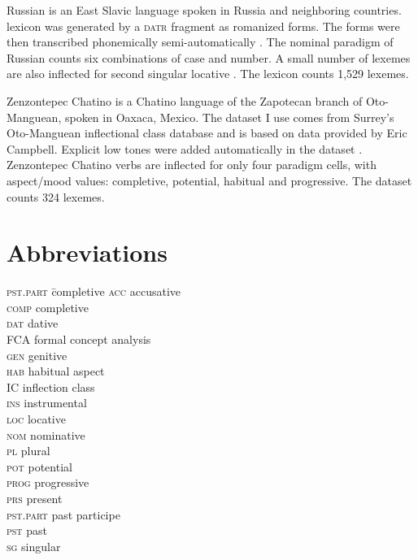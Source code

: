\documentclass[output=paper]{langscibook}
\begin{document}
    Russian is an East Slavic language spoken in Russia and neighboring countries.   lexicon was generated by a \textsc{datr} fragment \cite{BrownHippisley2012} as romanized forms. The forms were then transcribed phonemically semi-automatically \citep{BeniaminePhd}. The nominal paradigm of Russian counts six combinations of case and number. A small number of lexemes are also inflected for second singular locative \citep[see][]{Brown2007}. The lexicon counts 1,529 lexemes.

    Zenzontepec Chatino is a Chatino language of the Zapotecan branch of Oto-Manguean, spoken in Oaxaca, Mexico. The dataset I use comes from Surrey's Oto-Manguean inflectional class database \citep{FeistPalancar2015} and is based on data provided by Eric Campbell. Explicit low tones were added automatically in the dataset \citep{BeniaminePhd}. Zenzontepec Chatino verbs are inflected for only four paradigm cells, with aspect/mood values: completive, potential, habitual and progressive. The dataset counts 324 lexemes.

    \section*{Abbreviations}
    \begin{multicols}{2}
    \begin{tabbing}
    \textsc{pst.part}\hspace{1ex} \= completive\kill
    \textsc{acc} \> accusative\\
    \textsc{comp} \> completive\\
    \textsc{dat} \> dative\\
    FCA \> formal concept analysis\\
    \textsc{gen} \> genitive\\
    \textsc{hab} \> habitual aspect\\
    IC \> inflection class\\
    \textsc{ins} \> instrumental\\
    \textsc{loc} \> locative\\
    \textsc{nom} \> nominative\\
    \textsc{pl} \> plural    \\
    \textsc{pot} \> potential\\
    \textsc{prog} \> progressive \\
    \textsc{prs} \>  present \\
    \textsc{pst.part} \> past participe\\
    \textsc{pst} \> past\\
    \textsc{sg} \> singular\\
    \end{tabbing}
    \end{multicols} 
    
\end{document}
